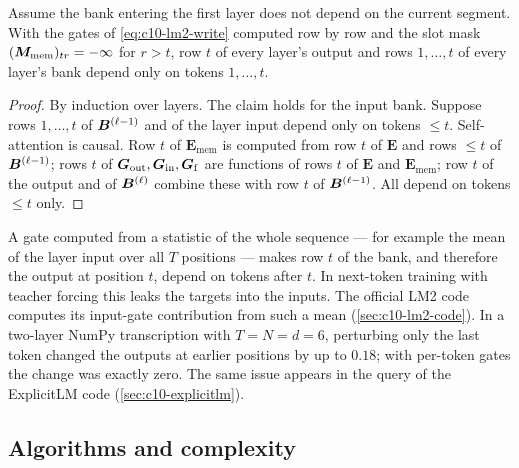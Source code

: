 \begin{proposition}\label{prop:c10-lm2-causal}
Assume the bank entering the first layer does not depend on the current segment. With the gates of
\cref{eq:c10-lm2-write} computed row by row and the slot mask $(\bm{M}_{\mathrm{mem}})_{tr} = -\infty$
for $r > t$, row $t$ of every layer's output and rows $1,\dots,t$ of every layer's bank depend only
on tokens $1,\dots,t$.
\end{proposition}
\begin{proof}
By induction over layers. The claim holds for the input bank. Suppose rows $1,\dots,t$ of
$\bm{B}^{(\ell-1)}$ and of the layer input depend only on tokens $\le t$. Self-attention is causal.
Row $t$ of $\bm{E}_{\mathrm{mem}}$ is computed from row $t$ of $\bm{E}$ and rows $\le t$ of
$\bm{B}^{(\ell-1)}$; rows $t$ of $\bm{G}_{\mathrm{out}}, \bm{G}_{\mathrm{in}}, \bm{G}_{\mathrm{f}}$ are functions
of rows $t$ of $\bm{E}$ and $\bm{E}_{\mathrm{mem}}$; row $t$ of the output and of
$\bm{B}^{(\ell)}$ combine these with row $t$ of $\bm{B}^{(\ell-1)}$. All depend on tokens $\le t$ only.
\end{proof}

\begin{pitfall}[title={Pitfall: pooling over the sequence breaks causality}]
A gate computed from a statistic of the whole sequence --- for example the mean of the layer input
over all $T$ positions --- makes row $t$ of the bank, and therefore the output at position $t$,
depend on tokens after $t$. In next-token training with teacher forcing this leaks the targets
into the inputs. The official LM2 code computes its input-gate contribution from such a mean
(\cref{sec:c10-lm2-code}). In a two-layer NumPy transcription with $T = N = d = 6$, perturbing only
the last token changed the outputs at earlier positions by up to $0.18$; with per-token gates the
change was exactly zero. The same issue appears in the query of the ExplicitLM code
(\cref{sec:c10-explicitlm}).
\end{pitfall}

\subsection{Algorithms and complexity}

